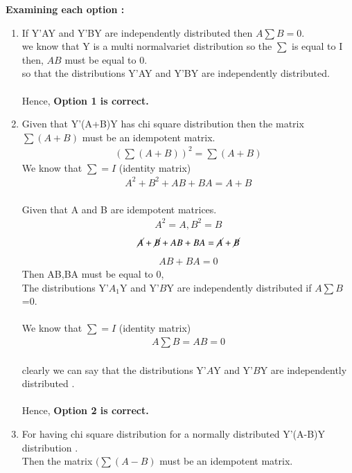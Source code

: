 \documentclass[journal,12pt,twocolumn]{IEEEtran}
\begin{document}
\textbf{Examining each option :} 
\begin{enumerate}
\item
If Y'AY and Y'BY are independently distributed then $A\sum B=0$.\\
we know that Y is a multi normalvariet distribution so the $\sum$ is equal to I then, $AB$ must be equal to 0.\\
so that the distributions  Y'AY and Y'BY are independently distributed.\\
\\Hence, \textbf{Option 1 is correct.}\\
\item
Given that Y'(A+B)Y has chi square distribution then the matrix $\sum(A+B)$ must be an idempotent matrix.\\
  \begin{align}
 (\textstyle \sum(A+B))^2=\sum(A+B) 
  \end{align}
   We know that $\sum=I$ (identity matrix)
    \begin{align}
  A^2+B^2+AB+BA=A+B 
  \end{align}
  \\Given that A and B are idempotent matrices.
    \begin{align}
 A^2=A ,B^2=B  
  \end{align}
   \begin{align}
 \cancel{A}+\cancel{B}+AB+BA=\cancel{A}+\cancel{B}
  \end{align}
  \begin{align}
 AB+BA=0 
  \end{align}
 Then AB,BA must be equal to 0,\\
The distributions Y'$A_1$Y and  Y'$B$Y  are independently distributed if $A\sum B$=0.\\
 \\We know that $\sum=I$ (identity matrix)
 \begin{align}
 A \textstyle \sum B=AB=0
   \end{align}
  \\ clearly we can say that the distributions Y'$A$Y and  Y'$B$Y  are independently distributed .\\
   \\Hence, \textbf{Option 2 is correct.}\\
   \item
For having chi square distribution for a normally distributed Y'(A-B)Y distribution .\\
 Then the matrix $(\sum(A-B)$  must be an idempotent matrix.\\

\end{enumerate}
\end{document}
